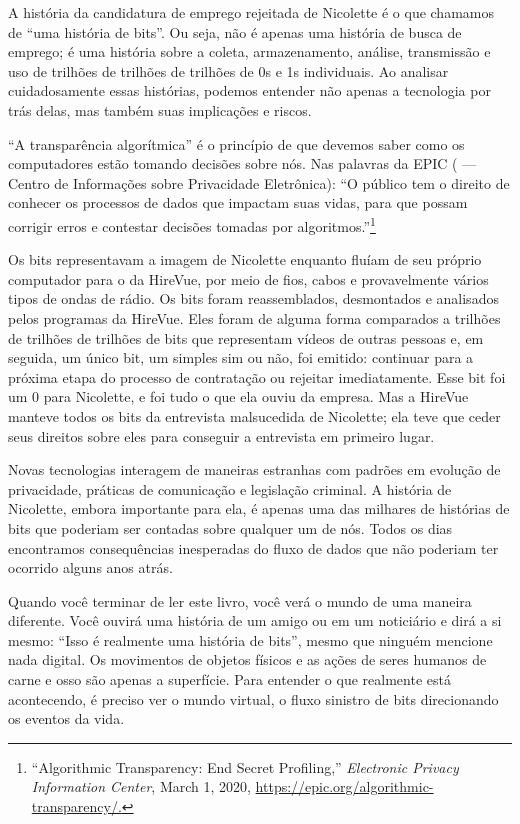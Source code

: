 A história da candidatura de emprego rejeitada de Nicolette é o que chamamos de 
``uma história de bits''. Ou seja, não é apenas uma história de busca de
emprego; é uma história sobre a coleta, armazenamento, análise, transmissão e
uso de trilhões de trilhões de trilhões de 0s e 1s individuais. Ao analisar
cuidadosamente essas histórias, podemos entender não apenas a tecnologia por
trás delas, mas também suas implicações e riscos.

\begin{tcolorbox}
``A transparência algorítmica'' é o princípio de que devemos saber como os
computadores estão tomando decisões sobre nós. Nas palavras da EPIC
( --- Centro de Informações sobre
Privacidade Eletrônica): ``O público tem o direito de conhecer os processos de
dados que impactam suas vidas, para que possam corrigir erros e contestar
decisões tomadas por algoritmos.''\footnote{``Algorithmic Transparency: End
Secret Profiling,'' \textit{Electronic Privacy Information Center}, March 1,
2020, \url{https://epic.org/algorithmic-transparency/.}}
\end{tcolorbox}

Os bits representavam a imagem de Nicolette enquanto fluíam de seu próprio
computador para o da HireVue, por meio de fios, cabos e provavelmente vários
tipos de ondas de rádio. Os bits foram reassemblados, desmontados e analisados
pelos programas da HireVue. Eles foram de alguma forma comparados a trilhões de
trilhões de trilhões de bits que representam vídeos de outras pessoas e, em
seguida, um único bit, um simples sim ou não, foi emitido: continuar para a
próxima etapa do processo de contratação ou rejeitar imediatamente. Esse bit foi
um 0 para Nicolette, e foi tudo o que ela ouviu da empresa. Mas a HireVue
manteve todos os bits da entrevista malsucedida de Nicolette; ela teve que ceder
seus direitos sobre eles para conseguir a entrevista em primeiro lugar.

Novas tecnologias interagem de maneiras estranhas com padrões em evolução de
privacidade, práticas de comunicação e legislação criminal. A história de 
Nicolette, embora importante para ela, é apenas uma das milhares de histórias de 
bits que poderiam ser contadas sobre qualquer um de nós. Todos os dias 
encontramos consequências inesperadas do fluxo de dados que não poderiam ter 
ocorrido alguns anos atrás.

Quando você terminar de ler este livro, você verá o mundo de uma maneira 
diferente. Você ouvirá uma história de um amigo ou em um noticiário e dirá a si 
mesmo: ``Isso é realmente uma história de bits'', mesmo que ninguém mencione
nada digital. Os movimentos de objetos físicos e as ações de seres humanos de 
carne e osso são apenas a superfície. Para entender o que realmente está 
acontecendo, é preciso ver o mundo virtual, o fluxo sinistro de bits 
direcionando os eventos da vida.

